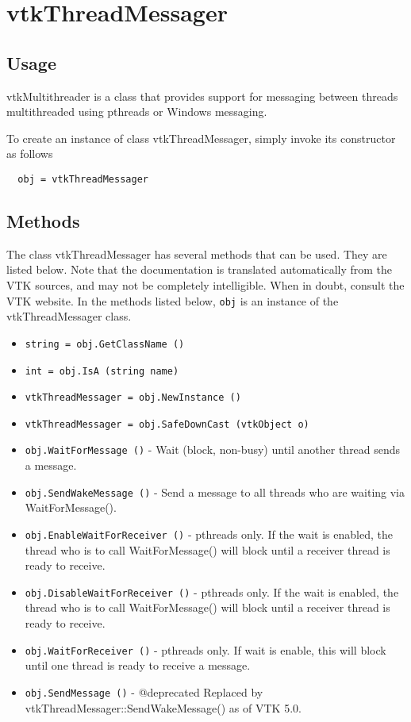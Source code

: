 \section{vtkThreadMessager}

\subsection{Usage}

 vtkMultithreader is a class that provides support for messaging between
 threads multithreaded using pthreads or Windows messaging.

To create an instance of class vtkThreadMessager, simply
invoke its constructor as follows
\begin{verbatim}
  obj = vtkThreadMessager
\end{verbatim}
\subsection{Methods}

The class vtkThreadMessager has several methods that can be used.
  They are listed below.
Note that the documentation is translated automatically from the VTK sources,
and may not be completely intelligible.  When in doubt, consult the VTK website.
In the methods listed below, \verb|obj| is an instance of the vtkThreadMessager class.
\begin{itemize}
\item  \verb|string = obj.GetClassName ()|

\item  \verb|int = obj.IsA (string name)|

\item  \verb|vtkThreadMessager = obj.NewInstance ()|

\item  \verb|vtkThreadMessager = obj.SafeDownCast (vtkObject o)|

\item  \verb|obj.WaitForMessage ()| -  Wait (block, non-busy) until another thread sends a
 message.

\item  \verb|obj.SendWakeMessage ()| -  Send a message to all threads who are waiting via
 WaitForMessage().

\item  \verb|obj.EnableWaitForReceiver ()| -  pthreads only. If the wait is enabled, the thread who
 is to call WaitForMessage() will block until a receiver
 thread is ready to receive.

\item  \verb|obj.DisableWaitForReceiver ()| -  pthreads only. If the wait is enabled, the thread who
 is to call WaitForMessage() will block until a receiver
 thread is ready to receive.

\item  \verb|obj.WaitForReceiver ()| -  pthreads only.
 If wait is enable, this will block until one thread is ready
 to receive a message.

\item  \verb|obj.SendMessage ()| -  @deprecated Replaced by vtkThreadMessager::SendWakeMessage() as of
 VTK 5.0.

\end{itemize}
